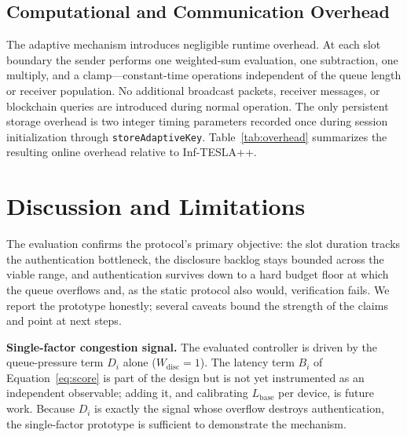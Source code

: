 \documentclass[conference]{IEEEtran}
\begin{document}
\subsection{Computational and Communication Overhead}
The adaptive mechanism introduces negligible runtime overhead. At each slot
boundary the sender performs one weighted-sum evaluation, one subtraction, one
multiply, and a clamp---constant-time operations independent of the queue length
or receiver population. No additional broadcast packets, receiver messages, or
blockchain queries are introduced during normal operation. The only persistent
storage overhead is two integer timing parameters recorded once during session
initialization through \texttt{storeAdaptiveKey}. Table~\ref{tab:overhead}
summarizes the resulting online overhead relative to Inf-TESLA++.

\begin{table}[t]
\caption{Overhead comparison (online phase, probabilistic mode).}
\label{tab:overhead}
\centering
\footnotesize
\setlength{\tabcolsep}{4pt}
\end{table}

\section{Discussion and Limitations}\label{sec:discussion}

The evaluation confirms the protocol's primary objective: the slot duration
tracks the authentication bottleneck, the disclosure backlog stays bounded across
the viable range, and authentication survives down to a hard budget floor at which
the queue overflows and, as the static protocol also would, verification fails.
We report the prototype honestly; several caveats bound the strength of the claims
and point at next steps.

\textbf{Single-factor congestion signal.} The evaluated controller is driven by
the queue-pressure term $D_i$ alone ($W_{\mathrm{disc}}=1$). The latency term
$B_i$ of Equation~\eqref{eq:score} is part of the design but is not yet
instrumented as an independent observable; adding it, and calibrating
$L_{\mathrm{base}}$ per device, is future work. Because $D_i$ is exactly the
signal whose overflow destroys authentication, the single-factor prototype is
sufficient to demonstrate the mechanism.
\end{document}

